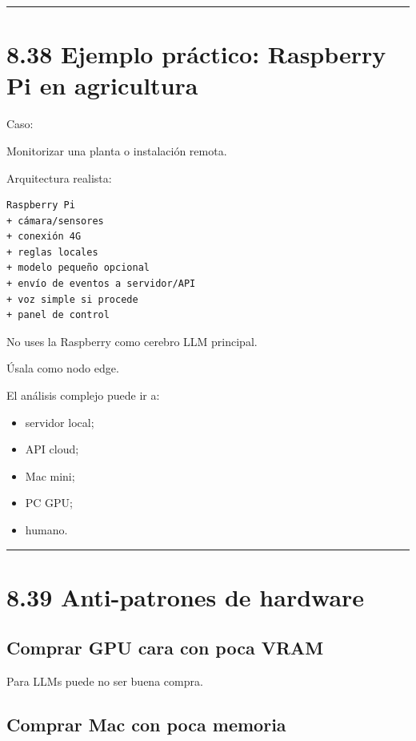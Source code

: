 \begin{center}\rule{0.5\linewidth}{0.5pt}\end{center}

\section{8.38 Ejemplo práctico: Raspberry Pi en
agricultura}\label{ejemplo-pruxe1ctico-raspberry-pi-en-agricultura}

Caso:

Monitorizar una planta o instalación remota.

Arquitectura realista:

\begin{lstlisting}
Raspberry Pi
+ cámara/sensores
+ conexión 4G
+ reglas locales
+ modelo pequeño opcional
+ envío de eventos a servidor/API
+ voz simple si procede
+ panel de control
\end{lstlisting}

No uses la Raspberry como cerebro LLM principal.

Úsala como nodo edge.

El análisis complejo puede ir a:

\begin{itemize}
\tightlist
\item
  servidor local;
\item
  API cloud;
\item
  Mac mini;
\item
  PC GPU;
\item
  humano.
\end{itemize}

\begin{center}\rule{0.5\linewidth}{0.5pt}\end{center}

\section{8.39 Anti-patrones de
hardware}\label{anti-patrones-de-hardware}

\subsection{Comprar GPU cara con poca
VRAM}\label{comprar-gpu-cara-con-poca-vram}

Para LLMs puede no ser buena compra.

\subsection{Comprar Mac con poca
memoria}\label{comprar-mac-con-poca-memoria}

